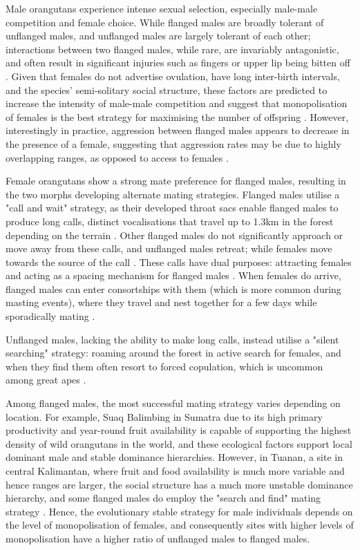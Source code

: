 Male orangutans experience intense sexual selection, especially male-male competition and female choice. While flanged males are broadly tolerant of unflanged males, and unflanged males are largely tolerant of each other; interactions between two flanged males, while rare, are invariably antagonistic, and often result in significant injuries such as fingers or upper lip being bitten off \citep{Setia.2008}. Given that females do not advertise ovulation, have long inter-birth intervals, and the species' semi-solitary social structure, these factors are predicted to increase the intensity of male-male competition and suggest that monopolisation of females is the best strategy for maximising the number of offspring \citep{Galdikas.1985, Kappeler.2022}. However, interestingly in practice, aggression between flanged males appears to decrease in the presence of a female, suggesting that aggression rates may be due to highly overlapping ranges, as opposed to access to females \citep{Dunkel.2013,Marty.2015}.

Female orangutans show a strong mate preference for flanged males, resulting in the two morphs developing alternate mating strategies. Flanged males utilise a "call and wait" strategy, as their developed throat sacs enable flanged males to produce long calls, distinct vocalisations that travel up to 1.3km in the forest depending on the terrain \citep{Spillmann.2016}. Other flanged males do not significantly approach or move away from these calls, and unflanged males retreat; while females move towards the source of the call \citep{Setia.2007}. These calls have dual purposes: attracting females and acting as a spacing mechanism for flanged males \citep{Spillmann.2010}. When females do arrive, flanged males can enter consortships with them (which is more common during masting events), where they travel and nest together for a few days while sporadically mating \citep{Atmoko.2008saj}. 

Unflanged males, lacking the ability to make long calls, instead utilise a "silent searching" strategy: roaming around the forest in active search for females, and when they find them often resort to forced copulation, which is uncommon among great apes \citep{Atmoko.2008saj, Utami.2002km8}. 

Among flanged males, the most successful mating strategy varies depending on location. For example, Suaq Balimbing in Sumatra due to its high primary productivity and year-round fruit availability is capable of supporting the highest density of wild orangutans in the world, and these ecological factors support local dominant male and stable dominance hierarchies. However, in Tuanan, a site in central Kalimantan, where fruit and food availability is much more variable and hence ranges are larger, the social structure has a much more unstable dominance hierarchy, and some flanged males do employ the "search and find" mating strategy \citep{Kunz.2023}. Hence, the evolutionary stable strategy for male individuals depends on the level of monopolisation of females, and consequently sites with higher levels of monopolisation have a higher ratio of unflanged males to flanged males.

